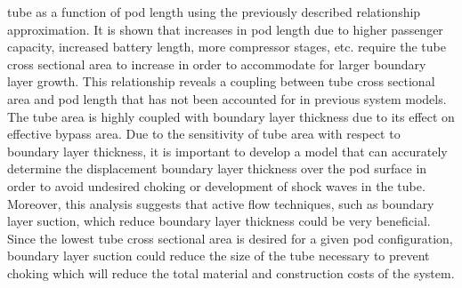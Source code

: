 tube as a function of pod length using the previously described relationship
approximation. It is shown that increases in pod length due to higher passenger
capacity, increased battery length, more compressor stages, etc. require the
tube cross sectional area to increase in order to accommodate for larger
boundary layer growth. This relationship reveals a coupling between tube cross
sectional area and pod length that has not been accounted for in previous system models.
The tube area is highly coupled with boundary layer thickness due to its effect on effective bypass area.
Due to the sensitivity of tube area with respect to boundary layer thickness,
it is important to develop a model that can accurately determine the
displacement boundary layer thickness over the pod surface in order to avoid
undesired choking or development of shock waves in the tube. Moreover,
this analysis suggests that active flow techniques, such as boundary layer suction,
which reduce boundary layer thickness could be very beneficial.
Since the lowest tube cross sectional area is desired for a given pod configuration,
boundary layer suction could reduce the size of the tube necessary to prevent
choking which will reduce the total material and construction costs of the system.
